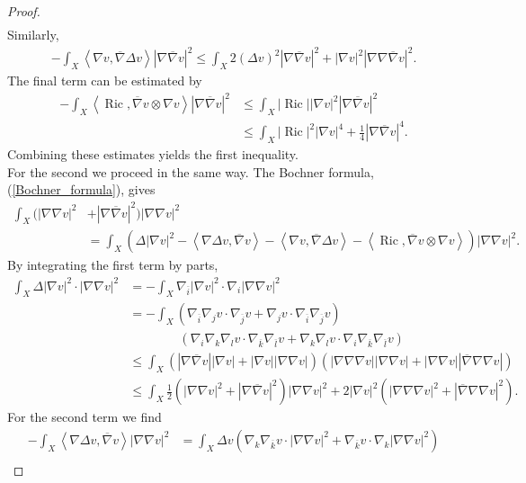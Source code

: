 \documentclass[10pt,a4paper]{amsart}
\DeclareMathOperator{\Ric}{Ric}
\newcommand{\ip}[1]{\left\langle#1\right\rangle}
\newcommand{\oo}[1]{\overline{#1}}
\begin{document}
\begin{proof}
{\begin{align*}
\end{align*}
}
Similarly,
\begin{align*}
    -\int_X \ip{\nabla v, \oo{\nabla} \Delta v} |\nabla \oo{\nabla} v|^2 \leq \int_X 2(\Delta v)^2 |\nabla \oo{\nabla} v|^2 + |\nabla v|^2 |\nabla\nabla \oo{\nabla} v|^2.
\end{align*}
The final term can be estimated by
\begin{align*}
    -\int_X \ip{\Ric, \oo{\nabla} v \otimes \nabla v} |\nabla \oo{\nabla} v|^2 &\leq \int_X |\Ric| |\nabla v|^2 |\nabla \oo{\nabla} v|^2\\
    &\leq \int_X |\Ric|^2|\nabla v|^4 + \frac{1}{4} |\nabla \oo{\nabla} v|^4.
\end{align*}
Combining these estimates yields the first inequality.\\
For the second we proceed in the same way. The Bochner formula, (\ref{Bochner_formula}), gives
\begin{align*}
    \int_X (|\nabla \nabla v|^2 &+ |\nabla \oo{\nabla} v|^2) |\nabla \nabla v|^2\\
    &= \int_X (\Delta |\nabla v|^2 - \ip{\nabla \Delta v, \oo{\nabla} v} - \ip{\nabla v, \oo{\nabla} \Delta v} - \ip{\Ric, \oo{\nabla} v\otimes \nabla v}) |\nabla \nabla v|^2.
\end{align*}
By integrating the first term by parts,
\begin{align*}
    \int_X \Delta |\nabla v|^2 \cdot |\nabla \nabla v|^2 &= -\int_X \nabla_{\oo{i}} |\nabla v|^2 \cdot \nabla_i|\nabla \nabla v|^2\\
    &= - \int_X (\nabla_{\oo{i}} \nabla_j v \cdot \nabla_{\oo{j}} v + \nabla_j v \cdot \nabla_{\oo{i}} \nabla_{\oo{j}} v)\\
    &\quad\quad\quad\quad (\nabla_i \nabla_k \nabla_l v\cdot \nabla_{\oo{k}}\nabla_{\oo{l}} v + \nabla_k \nabla_l v \cdot \nabla_i \nabla_{\oo{k}} \nabla_{\oo{l}} v)\\
    &\leq \int_X (|\nabla \oo{\nabla} v||\nabla v| + |\nabla v||\nabla \nabla v|)(|\nabla \nabla \nabla v| |\nabla\nabla v| + |\nabla \nabla v| |\oo{\nabla} \nabla \nabla v|)\\
    &\leq \int_X \frac{1}{2} (|\nabla \nabla v|^2 + |\nabla \oo{\nabla} v|^2)|\nabla \nabla v|^2 + 2|\nabla v|^2 (|\nabla\nabla \nabla v|^2 + |\oo{\nabla} \nabla \nabla v|^2).
\end{align*}
For the second term we find
{\allowdisplaybreaks
\begin{align*}
    -\int_X \ip{\nabla \Delta v, \oo{\nabla} v} |\nabla \nabla v|^2 &= \int_X \Delta v (\nabla_k \nabla_{\oo{k}} v \cdot |\nabla \nabla v|^2 + \nabla_{\oo{k}} v \cdot \nabla_k |\nabla \nabla v|^2)\\

\end{align*}}
\end{proof}
\end{document}
